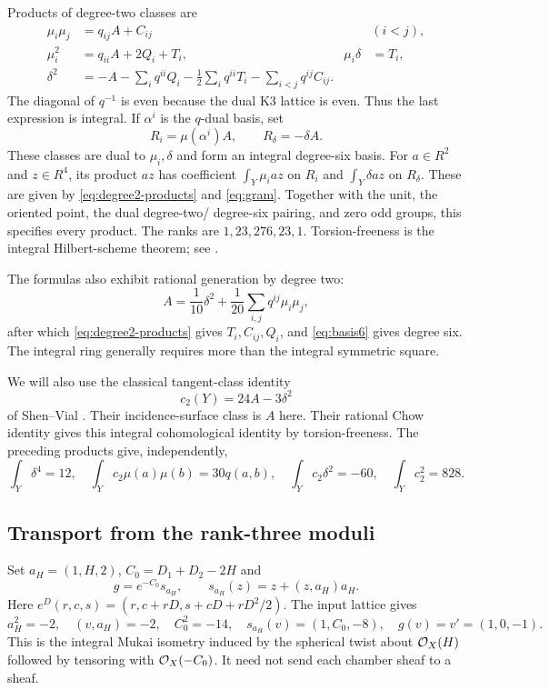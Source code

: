Products of degree-two classes are
\begin{equation}\label{eq:degree2-products}
 \begin{aligned}
 \mu_i\mu_j&=q_{ij}A+C_{ij} &&(i<j),\\
 \mu_i^2&=q_{ii}A+2Q_i+T_i,&\mu_i\delta&=T_i,\\
 \delta^2&=-A-\sum_iq^{ii}Q_i-\tfrac12\sum_iq^{ii}T_i
                     -\sum_{i<j}q^{ij}C_{ij}.
 \end{aligned}
\end{equation}
The diagonal of $q^{-1}$ is even because the dual K3 lattice is
even. Thus the last expression is integral. If $\alpha^i$ is the
$q$-dual basis, set
\begin{equation}\label{eq:basis6}
 R_i=\mu(\alpha^i)A,\qquad R_\delta=-\delta A.
\end{equation}
These classes are dual to $\mu_i,\delta$ and form an integral
degree-six basis. For $a\in R^2$ and $z\in R^4$, its product
$az$ has coefficient $\int_Y\mu_i az$ on $R_i$ and
$\int_Y\delta az$ on $R_\delta$. These are given by
\eqref{eq:degree2-products} and \eqref{eq:gram}.
Together with the unit, the oriented point, the dual degree-two/
degree-six pairing, and zero odd groups, this specifies every product.
The ranks are $1,23,276,23,1$. Torsion-freeness is the integral
Hilbert-scheme theorem; see \cite[Theorem~3.1]{totaro}.

The formulas also exhibit rational generation by degree two:
\begin{equation}\label{eq:rational-generation}
 A=\frac1{10}\delta^2+\frac1{20}\sum_{i,j}q^{ij}\mu_i\mu_j,
\end{equation}
after which \eqref{eq:degree2-products} gives $T_i,C_{ij},Q_i$,
and \eqref{eq:basis6} gives degree six. The integral ring generally
requires more than the integral symmetric square.

We will also use the classical tangent-class identity
\begin{equation}\label{eq:c2}
 c_2(Y)=24A-3\delta^2
\end{equation}
of Shen--Vial \cite[Lemma~14.4]{sv}. Their incidence-surface
class is $A$ here. Their rational Chow identity gives this integral
cohomological identity by torsion-freeness. The preceding products
give, independently,
\[
 \int_Y\delta^4=12,\quad
 \int_Y c_2\mu(a)\mu(b)=30q(a,b),\quad
 \int_Yc_2\delta^2=-60,\quad \int_Yc_2^2=828.
\]

\subsection{Transport from the rank-three moduli}
Set $a_H=(1,H,2)$, $C_0=D_1+D_2-2H$ and
\begin{equation}\label{eq:g}
 g=e^{-C_0}s_{a_H},\qquad s_{a_H}(z)=z+(z,a_H)a_H.
\end{equation}
Here $e^D(r,c,s)=(r,c+rD,s+cD+rD^2/2)$.
The input lattice gives
\[
 a_H^2=-2,\quad (v,a_H)=-2,\quad C_0^2=-14,\quad
 s_{a_H}(v)=(1,C_0,-8),\quad g(v)=v'=(1,0,-1).
\]
This is the integral Mukai isometry induced by the spherical twist
about $\mathcal O_X(H)$ followed by tensoring with $\mathcal O_X(-C_0)$.
It need not send each chamber sheaf to a sheaf.

